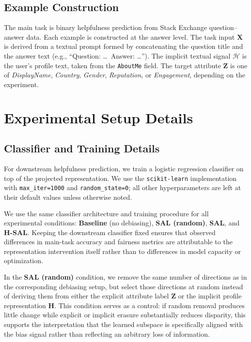 \documentclass[11pt]{article}
\newcommand{\rv}[1]{\mathbf{#1}}
\begin{document}
\subsection{Example Construction}
\label{app:example-construction}
The main task is binary helpfulness prediction from Stack Exchange question--answer data. Each example is constructed at the answer level. The task input $\rv{X}$ is derived from a textual prompt formed by concatenating the question title and the answer text (e.g., ``Question: \ldots\ Answer: \ldots''). The implicit textual signal $\mathcal{H}$ is the user's profile text, taken from the \texttt{AboutMe} field. The target attribute $\rv{Z}$ is one of \textit{DisplayName}, \textit{Country}, \textit{Gender}, \textit{Reputation}, or \textit{Engagement}, depending on the experiment.







\section{Experimental Setup Details}
\subsection{Classifier and Training Details}
\label{app:classifier-details}

For downstream helpfulness prediction, we train a logistic regression classifier on top of the projected representation. We use the \texttt{scikit-learn} implementation with \texttt{max\_iter=1000} and \texttt{random\_state=0}; all other hyperparameters are left at their default values unless otherwise noted.

We use the same classifier architecture and training procedure for all experimental conditions: \textbf{Baseline} (no debiasing), \textbf{SAL (random)}, \textbf{SAL}, and \textbf{H-SAL}. Keeping the downstream classifier fixed ensures that observed differences in main-task accuracy and fairness metrics are attributable to the representation intervention itself rather than to differences in model capacity or optimization.

In the \textbf{SAL (random)} condition, we remove the same number of directions as in the corresponding debiasing setup, but select those directions at random instead of deriving them from either the explicit attribute label $\rv{Z}$ or the implicit profile representation $\rv{H}$. This condition serves as a control: if random removal produces little change while explicit or implicit erasure substantially reduces disparity, this supports the interpretation that the learned subspace is specifically aligned with the bias signal rather than reflecting an arbitrary loss of information.
\end{document}
